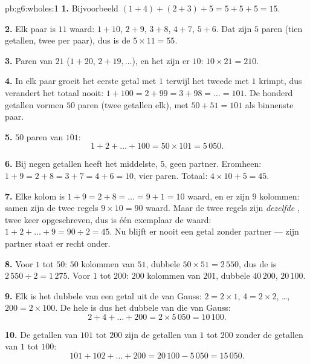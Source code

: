 \begin{solution}{pb:g6:wholes:1}
\textbf{1.} Bijvoorbeeld $(1 + 4) + (2 + 3) + 5 = 5 + 5 + 5 = 15$.

\textbf{2.} Elk paar is $11$ waard: $1 + 10$, $2 + 9$, $3 + 8$, $4 + 7$,
$5 + 6$. Dat zijn $5$ paren (tien getallen, twee per paar), dus is de 
$5 \times 11 = 55$.

\textbf{3.} Paren van $21$ ($1 + 20$, $2 + 19, \dots$), en het zijn er $10$:
$10 \times 21 = 210$.

\textbf{4.} In elk paar groeit het eerste getal met $1$ terwijl het tweede met
$1$ krimpt, dus verandert het totaal nooit:
$1 + 100 = 2 + 99 = 3 + 98 = \dots = 101$. De honderd getallen vormen $50$
paren (twee getallen elk), met $50 + 51 = 101$ als binnenste paar.

\textbf{5.} $50$ paren van $101$:
\[
1 + 2 + \dots + 100 = 50 \times 101 = 5\,050 .
\]

\textbf{6.} Bij negen getallen heeft het middelste, $5$, geen partner.
Eromheen: $1 + 9 = 2 + 8 = 3 + 7 = 4 + 6 = 10$, vier paren. Totaal:
$4 \times 10 + 5 = 45$.

\textbf{7.} Elke kolom is $1 + 9 = 2 + 8 = \dots = 9 + 1 = 10$ waard, en er
zijn $9$ kolommen: samen zijn de twee regels $9 \times 10 = 90$ waard. Maar de
twee regels zijn \emph{dezelfde} , twee keer opgeschreven, dus is één
exemplaar de  waard: $1 + 2 + \dots + 9 = 90 \div 2 = 45$. Nu blijft er
nooit een getal zonder partner --- zijn partner staat er recht onder.

\textbf{8.} Voor $1$ tot $50$: $50$ kolommen van $51$, dubbele 
$50 \times 51 = 2\,550$, dus de  is $2\,550 \div 2 = 1\,275$. Voor $1$ tot
$200$: $200$ kolommen van $201$, dubbele  $40\,200$,  $20\,100$.

\textbf{9.} Elk  is het dubbele van een getal uit de  van Gauss:
$2 = 2 \times 1$, $4 = 2 \times 2$, \dots, $200 = 2 \times 100$. De hele 
is dus het dubbele van die van Gauss:
\[
2 + 4 + \dots + 200 = 2 \times 5\,050 = 10\,100 .
\]

\textbf{10.} De getallen van $101$ tot $200$ zijn de getallen van $1$ tot
$200$ zonder de getallen van $1$ tot $100$:
\[
101 + 102 + \dots + 200 = 20\,100 - 5\,050 = 15\,050 .
\]


\end{solution}
